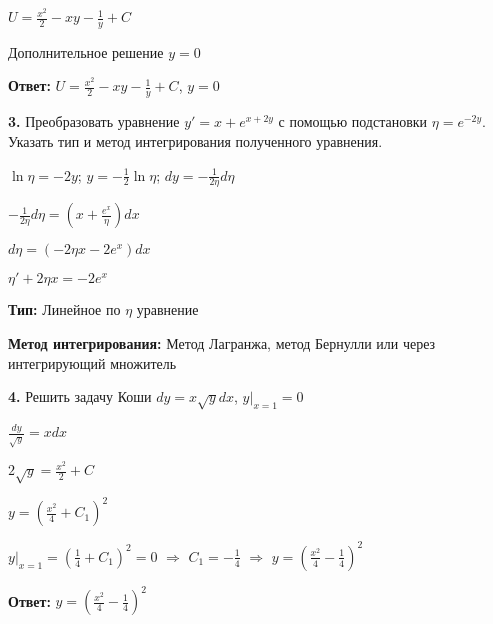 \documentclass[a4paper]{article}
\begin{document}
\vspace{0.3cm}
     
$\displaystyle U=\frac{x^2}{2}-xy-\frac{1}{y}+C$

\vspace{0.3cm}
     
Дополнительное решение $\displaystyle y=0$

\vspace{0.3cm}

\textbf{Ответ: } $\displaystyle U=\frac{x^2}{2}-xy-\frac{1}{y}+C$, $\displaystyle y=0$

\vspace{1cm}

\textbf{3.} Преобразовать уравнение $\displaystyle y'=x+ e^{x+2y}$ с помощью подстановки $\displaystyle \eta=e^{-2y}$. Указать тип и метод интегрирования полученного уравнения.

\vspace{0.3cm}

$\displaystyle \ln{\eta}=-2y$; \hspace{0.7cm} $\displaystyle y=-\frac{1}{2}\ln{\eta}$; \hspace{0.7cm} $\displaystyle dy=-\frac{1}{2\eta}d\eta$

\vspace{0.3cm}

$\displaystyle -\frac{1}{2\eta}d\eta=(x+\frac{e^x}{\eta})dx$

\vspace{0.3cm}

$\displaystyle d\eta=(-2\eta x-2e^x)dx$

\vspace{0.3cm}

$\displaystyle \eta'+2\eta x=-2e^x$

\vspace{0.3cm}

\textbf{Тип: } Линейное по $\eta$ уравнение

\textbf{Метод интегрирования: } Метод Лагранжа, метод Бернулли или через интегрирующий множитель

\vspace{1cm}

\textbf{4.} Решить задачу Коши $\displaystyle dy=x \sqrt{y}dx$, $\displaystyle y|_{x=1}=0$

\vspace{0.3cm}

$\displaystyle \frac{dy}{\sqrt{y}}=xdx$

\vspace{0.3cm}

$\displaystyle 2 \sqrt{y}=\frac{x^2}{2}+C$

\vspace{0.3cm}

$\displaystyle y=(\frac{x^2}{4}+C_1)^2$

\vspace{0.3cm}

$\displaystyle y|_{x=1}=(\frac{1}{4}+C_1)^2=0$ $\Rightarrow$ $C_1=-\frac{1}{4}$ $\Rightarrow$ $\displaystyle y=(\frac{x^2}{4}-\frac{1}{4})^2$

\vspace{0.3cm}

\textbf{Ответ: } $\displaystyle y=(\frac{x^2}{4}-\frac{1}{4})^2$
\end{document}
